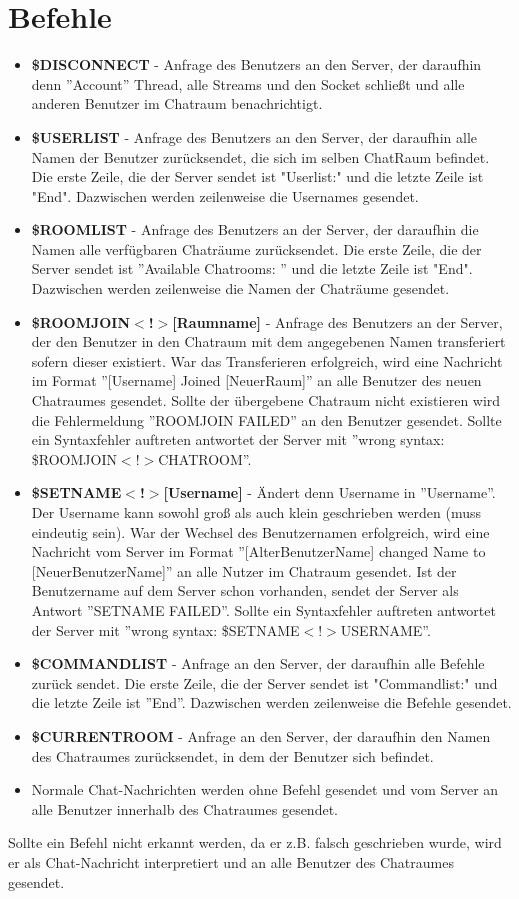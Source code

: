 \documentclass[a4paper, oneside]{scrreprt}
\begin{document}
\chapter{Befehle}
\begin{itemize}
\item \textbf{\$DISCONNECT} - Anfrage des Benutzers an den Server, der daraufhin denn ''Account'' Thread, alle Streams und den Socket schließt und alle anderen Benutzer im Chatraum benachrichtigt.
\item \textbf{\$USERLIST} - Anfrage des Benutzers an den Server, der daraufhin alle Namen der Benutzer zurücksendet, die sich im selben ChatRaum befindet. Die erste Zeile, die der Server sendet ist "Userlist:" und die letzte Zeile ist "End". Dazwischen werden zeilenweise die Usernames gesendet. 
\item \textbf{\$ROOMLIST} - Anfrage des Benutzers an der Server, der daraufhin die Namen alle verfügbaren Chaträume zurücksendet. Die erste Zeile, die der Server sendet ist ''Available Chatrooms: '' und die letzte Zeile ist "End". Dazwischen werden zeilenweise die Namen der Chaträume gesendet.
\item \textbf{\$ROOMJOIN$<$!$>$[Raumname]} - Anfrage des Benutzers an der Server, der den Benutzer in den Chatraum mit dem angegebenen Namen transferiert sofern dieser existiert. War das Transferieren erfolgreich, wird eine Nachricht im Format ''[Username] Joined [NeuerRaum]'' an alle Benutzer des neuen Chatraumes gesendet. Sollte der übergebene Chatraum nicht existieren wird die Fehlermeldung ''ROOMJOIN FAILED'' an den Benutzer gesendet. Sollte ein Syntaxfehler auftreten antwortet der Server mit ''wrong syntax: \$ROOMJOIN$<$!$>$CHATROOM''.
\item \textbf{\$SETNAME$<$!$>$[Username]} - Ändert denn Username in ''Username''. Der Username kann
sowohl groß als auch klein geschrieben werden (muss eindeutig sein). War der Wechsel des Benutzernamen erfolgreich, wird eine Nachricht vom Server im Format ''[AlterBenutzerName] changed Name to [NeuerBenutzerName]'' an alle Nutzer im Chatraum gesendet. Ist der Benutzername auf dem Server schon vorhanden, sendet der Server als Antwort ''SETNAME FAILED''. Sollte ein Syntaxfehler auftreten antwortet der Server mit ''wrong syntax: \$SETNAME$<$!$>$USERNAME''.
\item \textbf{\$COMMANDLIST} - Anfrage an den Server, der daraufhin alle Befehle zurück sendet. Die erste Zeile, die der Server sendet ist "Commandlist:" und die letzte Zeile ist ''End''. Dazwischen werden zeilenweise die Befehle gesendet.
\item \textbf{\$CURRENTROOM} - Anfrage an den Server, der daraufhin den Namen des Chatraumes zurücksendet, in dem der Benutzer sich befindet. 
\item Normale Chat-Nachrichten werden ohne Befehl gesendet und vom Server an alle Benutzer innerhalb des Chatraumes gesendet.
\end{itemize}
Sollte ein Befehl nicht erkannt werden, da er z.B. falsch geschrieben wurde, wird er als Chat-Nachricht interpretiert und an alle Benutzer des Chatraumes gesendet.
\newpage
\end{document}

